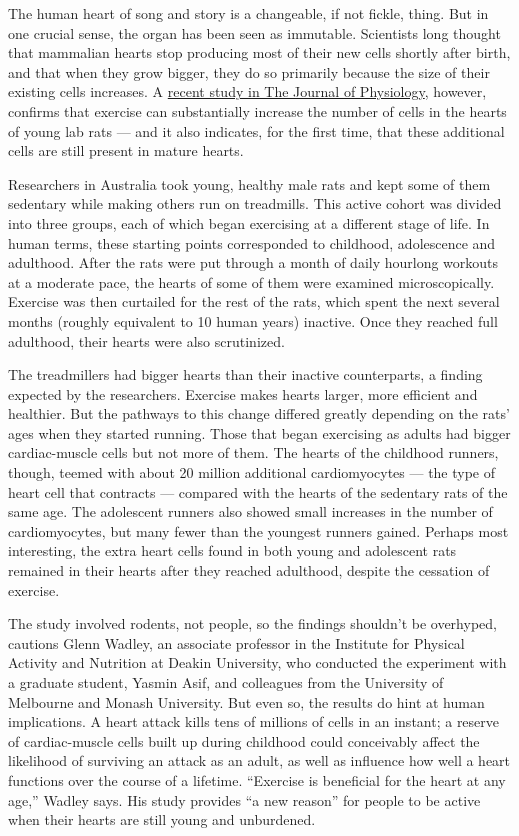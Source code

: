 The human heart of song and story is a changeable, if not fickle, thing.
But in one crucial sense, the organ has been seen as immutable.
Scientists long thought that mammalian hearts stop producing most of
their new cells shortly after birth, and that when they grow bigger,
they do so primarily because the size of their existing cells increases.
A
\href{https://physoc.onlinelibrary.wiley.com/doi/abs/10.1113/JP275339}{recent
study in The Journal of Physiology}, however, confirms that exercise can
substantially increase the number of cells in the hearts of young lab
rats --- and it also indicates, for the first time, that these
additional cells are still present in mature hearts.

Researchers in Australia took young, healthy male rats and kept some of
them sedentary while making others run on treadmills. This active cohort
was divided into three groups, each of which began exercising at a
different stage of life. In human terms, these starting points
corresponded to childhood, adolescence and adulthood. After the rats
were put through a month of daily hourlong workouts at a moderate pace,
the hearts of some of them were examined microscopically. Exercise was
then curtailed for the rest of the rats, which spent the next several
months (roughly equivalent to 10 human years) inactive. Once they
reached full adulthood, their hearts were also scrutinized.

The treadmillers had bigger hearts than their inactive counterparts, a
finding expected by the researchers. Exercise makes hearts larger, more
efficient and healthier. But the pathways to this change differed
greatly depending on the rats' ages when they started running. Those
that began exercising as adults had bigger cardiac-muscle cells but not
more of them. The hearts of the childhood runners, though, teemed with
about 20 million additional cardiomyocytes --- the type of heart cell
that contracts --- compared with the hearts of the sedentary rats of the
same age. The adolescent runners also showed small increases in the
number of cardiomyocytes, but many fewer than the youngest runners
gained. Perhaps most interesting, the extra heart cells found in both
young and adolescent rats remained in their hearts after they reached
adulthood, despite the cessation of exercise.

The study involved rodents, not people, so the findings shouldn't be
overhyped, cautions Glenn Wadley, an associate professor in the
Institute for Physical Activity and Nutrition at Deakin University, who
conducted the experiment with a graduate student, Yasmin Asif, and
colleagues from the University of Melbourne and Monash University. But
even so, the results do hint at human implications. A heart attack kills
tens of millions of cells in an instant; a reserve of cardiac-muscle
cells built up during childhood could conceivably affect the likelihood
of surviving an attack as an adult, as well as influence how well a
heart functions over the course of a lifetime. ``Exercise is beneficial
for the heart at any age,'' Wadley says. His study provides ``a new
reason'' for people to be active when their hearts are still young and
unburdened.

